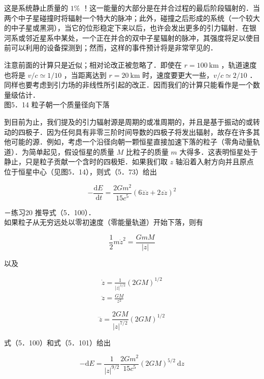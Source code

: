 这是系统静止质量的 $1 \%$ ！这一能量的大部分是在并合过程的最后阶段辐射的．当两个中子星碰撞时将辐射一个特大的脉冲；此外，碰撞之后形成的系统（一个较大的中子星或黑洞），当它的位形稳定下来以后，也许会发出更多的引力辐射．在银河系或邻近星系中某处，一个正在并合的双中子星辐射的脉冲，其强度将足以使目前可以利用的设备探测到；然而，这样的事件预计将是非常罕见的．

注意前面的计算只是近似；相对论改正被忽略了．即使在 $r=100 \mathrm{~km}$ ，轨道速度也将是 $v / c \simeq 1 / 10$ ，当距离达到 $r=20 \mathrm{~km}$ 时，速度要更大一些，$v / c \simeq 2 / 10$ ．同样也要考虑到引力场的非线性所引起的改正．因而我们的计算只能看作是一个数量级估计．\\


图5．14 粒子朝一个质量径向下落

到目前为止，我们提及的引力辐射源是周期的或准周期的，并且是基于振动的或转动的四极子．因为任何具有非零三阶时间导数的四极子将发出辐射，故存在许多其他可能的源．例如，考虑一个沿径向朝一颗恒星直接加速下落的粒子（零角动量轨道）．为简单起见，假设恒星的质量 $M$ 比粒子的质量 $m$ 大得多．这表明恒星处于静止，只是粒子贡献一个含时的四极矩．如果我们取 $z$ 轴沿着入射方向并且原点位于恒星中心（见图5．14），则式（5．73）给出


\begin{equation*}
	-\frac{\mathrm{d} E}{\mathrm{~d} t}=\frac{2 G m^{2}}{15 c^{5}}(6 \dddot{z} \ddot{z}+2 z \ddot{z})^{2} \tag{5.100}
\end{equation*}


－练习20 推导式（5．100）．\\
如果粒子从无穷远处以零初速度（零能量轨道）开始下落，则有


\begin{equation*}
	\frac{1}{2} m \dot{z}^{2}=\frac{G m M}{|z|} \tag{5.101}
\end{equation*}


以及

$$
\begin{gathered}
	\dot{z}=\frac{1}{|z|^{1 / 2}}(2 G M)^{1 / 2} \\
	\ddot{z}=\frac{G M}{z^{2}}
\end{gathered}
$$


\begin{equation*}
	\dddot{z}=\frac{2 G M}{|z|^{7 / 2}}(2 G M)^{1 / 2} \tag{5.102}
\end{equation*}


式（5．100）和式（5．101）给出


\begin{equation*}
	-\mathrm{d} E=\frac{1}{|z|^{9 / 2}} \frac{2 G m^{2}}{15 c^{5}}(2 G M)^{5 / 2} \mathrm{~d} z \tag{5.103}
\end{equation*}


